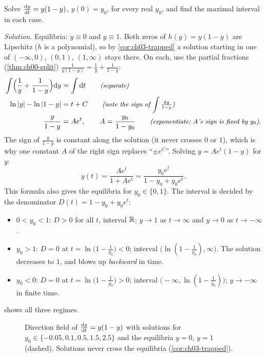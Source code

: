 \begin{example}\label{ex:ch03-logistic}
Solve $\frac{\mathrm{d}y}{\mathrm{d}t} = y(1 - y)$, $y(0) = y_0$, for every real $y_0$, and find the
maximal interval in each case.

\emph{Solution.} Equilibria: $y\equiv0$ and $y\equiv1$. Both zeros of
$h(y) = y(1-y)$ are Lipschitz ($h$ is a polynomial), so by
\cref{cor:ch03-trapped} a solution starting in one of $(-\infty,0)$, $(0,1)$,
$(1,\infty)$ stays there. On each, use the partial fractions
(\cref{thm:ch00-split}) $\frac{1}{y(1-y)} = \frac1y + \frac{1}{1-y}$:
\begin{align*}
  \int\Bigl(\frac1y + \frac1{1-y}\Bigr)\mathrm{d}y &= \int\mathrm{d}t \qquad\text{\small\itshape(separate)}\\
  \ln|y| - \ln|1-y| &= t + C \qquad\text{\small\itshape(note the sign of $\int\tfrac{\mathrm{d}y}{1-y}$)}\\
  \frac{y}{1-y} &= Ae^{t},\qquad A = \frac{y_0}{1-y_0}
     \qquad\text{\small\itshape(exponentiate; $A$'s sign is fixed by $y_0$)}.
\end{align*}
The sign of $\frac{y}{1-y}$ is constant along the solution (it never crosses
$0$ or $1$), which is why one constant $A$ of the right sign replaces
``$\pm e^C$''. Solving $y = Ae^t(1-y)$ for $y$:
\[
  y(t) = \frac{Ae^t}{1 + Ae^t} = \frac{y_0e^t}{1 - y_0 + y_0e^t}.
\]
This formula also gives the equilibria for $y_0\in\{0,1\}$. The interval is
decided by the denominator $D(t) = 1 - y_0 + y_0e^t$:
\begin{itemize}
  \item $0<y_0<1$: $D>0$ for all $t$, interval $\mathbb{R}$; $y\to1$ as $t\to\infty$
        and $y\to 0$ as $t\to-\infty$.
  \item $y_0>1$: $D = 0$ at $t = \ln\bigl(1 - \frac1{y_0}\bigr)<0$; interval
        $\bigl(\ln(1 - \frac{1}{y_0}),\infty\bigr)$. The solution decreases to
        $1$, and blows up \emph{backward} in time.
  \item $y_0<0$: $D = 0$ at $t = \ln\bigl(1 - \frac1{y_0}\bigr)>0$; interval
        $\bigl(-\infty,\ln(1-\frac{1}{y_0})\bigr)$; $y\to-\infty$ in finite time.
\end{itemize}
 shows all three regimes.
\end{example}

\begin{figure}[ht]
  \centering
  
  \caption{Direction field of $\frac{\mathrm{d}y}{\mathrm{d}t} = y(1-y)$ with solutions for
  $y_0\in\{-0.05, 0.1, 0.5, 1.5, 2.5\}$ and the equilibria $y = 0$, $y = 1$
  (dashed). Solutions never cross the equilibria (\cref{cor:ch03-trapped}).}
  \label{fig:ch03-logistic}
\end{figure}


